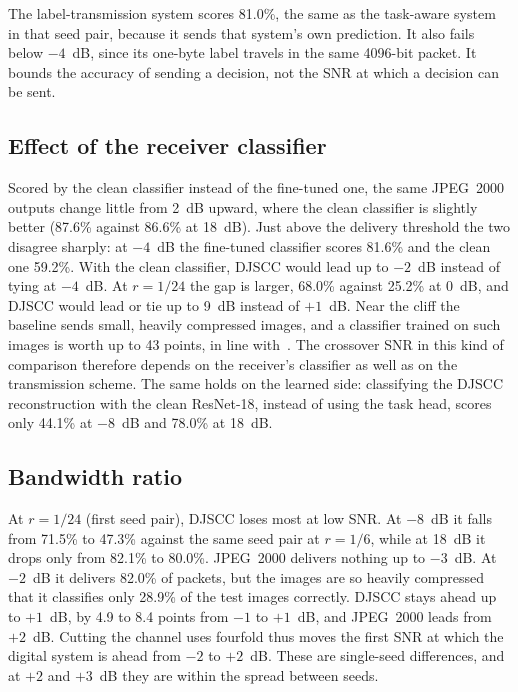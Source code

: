 \documentclass[conference]{IEEEtran}
\begin{document}
The label-transmission system scores 81.0\%, the same as the task-aware system in that seed pair, because it sends that system's own prediction. It also fails below $-4$~dB, since its one-byte label travels in the same 4096-bit packet. It bounds the accuracy of sending a decision, not the SNR at which a decision can be sent.

\subsection{Effect of the receiver classifier}
Scored by the clean classifier instead of the fine-tuned one, the same JPEG~2000 outputs change little from 2~dB upward, where the clean classifier is slightly better (87.6\% against 86.6\% at 18~dB). Just above the delivery threshold the two disagree sharply: at $-4$~dB the fine-tuned classifier scores 81.6\% and the clean one 59.2\%. With the clean classifier, DJSCC would lead up to $-2$~dB instead of tying at $-4$~dB. At $r=1/24$ the gap is larger, 68.0\% against 25.2\% at 0~dB, and DJSCC would lead or tie up to 9~dB instead of $+1$~dB. Near the cliff the baseline sends small, heavily compressed images, and a classifier trained on such images is worth up to 43 points, in line with~\cite{janeiro2023}. The crossover SNR in this kind of comparison therefore depends on the receiver's classifier as well as on the transmission scheme. The same holds on the learned side: classifying the DJSCC reconstruction with the clean ResNet-18, instead of using the task head, scores only 44.1\% at $-8$~dB and 78.0\% at 18~dB.

\subsection{Bandwidth ratio}
At $r=1/24$ (first seed pair), DJSCC loses most at low SNR. At $-8$~dB it falls from 71.5\% to 47.3\% against the same seed pair at $r=1/6$, while at 18~dB it drops only from 82.1\% to 80.0\%. JPEG~2000 delivers nothing up to $-3$~dB. At $-2$~dB it delivers 82.0\% of packets, but the images are so heavily compressed that it classifies only 28.9\% of the test images correctly. DJSCC stays ahead up to $+1$~dB, by 4.9 to 8.4 points from $-1$ to $+1$~dB, and JPEG~2000 leads from $+2$~dB. Cutting the channel uses fourfold thus moves the first SNR at which the digital system is ahead from $-2$ to $+2$~dB. These are single-seed differences, and at $+2$ and $+3$~dB they are within the spread between seeds.
\end{document}
